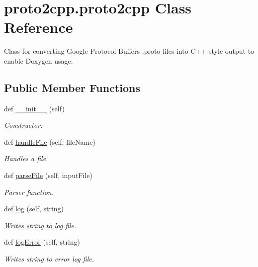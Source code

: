 \hypertarget{classproto2cpp_1_1proto2cpp}{}\section{proto2cpp.\+proto2cpp Class Reference}
\label{classproto2cpp_1_1proto2cpp}


Class for converting Google Protocol Buffers .proto files into C++ style output to enable Doxygen usage.  


\subsection*{Public Member Functions}
\begin{DoxyCompactItemize}
\item 
def \hyperlink{classproto2cpp_1_1proto2cpp_abcf9a7abb1604b617e3801d4922b3dc9}{\+\_\+\+\_\+init\+\_\+\+\_\+} (self)\hypertarget{classproto2cpp_1_1proto2cpp_abcf9a7abb1604b617e3801d4922b3dc9}{}\label{classproto2cpp_1_1proto2cpp_abcf9a7abb1604b617e3801d4922b3dc9}

\begin{DoxyCompactList}\small\item\em Constructor. \end{DoxyCompactList}\item 
def \hyperlink{classproto2cpp_1_1proto2cpp_a2bcc7c327b92a76c52755c65ea109b03}{handle\+File} (self, file\+Name)
\begin{DoxyCompactList}\small\item\em Handles a file. \end{DoxyCompactList}\item 
def \hyperlink{classproto2cpp_1_1proto2cpp_a1046dd01a756585c624a8d6734dc40d7}{parse\+File} (self, input\+File)
\begin{DoxyCompactList}\small\item\em Parser function. \end{DoxyCompactList}\item 
def \hyperlink{classproto2cpp_1_1proto2cpp_af4e633c25a2a6c31a3a806c7caadfb8b}{log} (self, string)
\begin{DoxyCompactList}\small\item\em Writes {\ttfamily string} to log file. \end{DoxyCompactList}\item 
def \hyperlink{classproto2cpp_1_1proto2cpp_a570535cb2a7a699d673877fc5c8c905b}{log\+Error} (self, string)
\begin{DoxyCompactList}\small\item\em Writes {\ttfamily string} to error log file. \end{DoxyCompactList}\end{DoxyCompactItemize}
